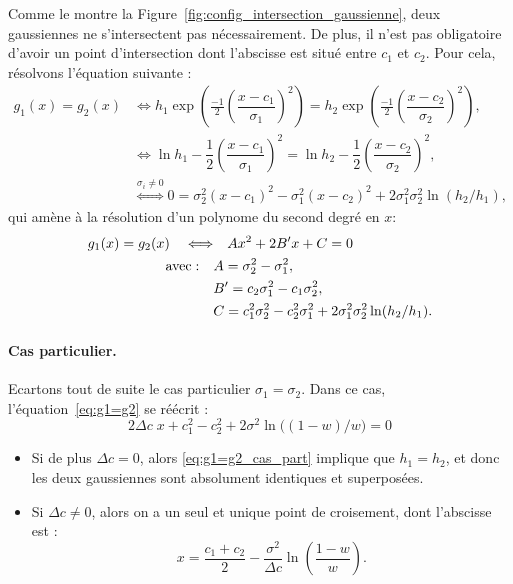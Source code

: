 \documentclass[main.tex]{subfiles}
\begin{document}
Comme le montre la Figure~\ref{fig:config_intersection_gaussienne}, deux gaussiennes ne s'intersectent pas nécessairement. De plus, il n'est pas obligatoire d'avoir un point d'intersection dont l'abscisse est situé entre $c_1$ et $c_2$. Pour cela, résolvons l'équation suivante :
\begin{align*}
g_1(x)=g_2(x) 
& \Leftrightarrow h_1\exp \left(\frac{-1}{2} \left( \dfrac{x-c_1}{\sigma_1}\right)^2  \right) = h_2\exp \left(\frac{-1}{2} \left( \dfrac{x-c_2}{\sigma_2}\right)^2  \right), \\
& \Leftrightarrow \ln h_1 - \dfrac{1}{2}\left( \dfrac{x-c_1}{\sigma_1} \right)^2 = \ln h_2 - \dfrac{1}{2}\left( \dfrac{x-c_2}{\sigma_2} \right)^2, \\
& \overset{\sigma_i \neq 0}{\Leftrightarrow} 0 = \sigma_2^2 (x-c_1)^2 - \sigma_1^2 (x-c_2)^2 + 2\sigma_1^2\sigma_2^2 \ln( h_2 / h_1 ),
\end{align*}
qui amène à la résolution d'un polynome du second degré en $x$:
\begin{equation}
\begin{aligned}
\label{eq:g1=g2}
g_1(x)=g_2(x) \quad \Longleftrightarrow & \quad  Ax^2 + 2B'x + C =0 \\
{\rm avec :} \quad &A=\sigma_2^2 - \sigma_1^2, \\
& B'=c_2\sigma_1^2-c_1\sigma_2^2,\\
& C= c_1^2\sigma_2^2-c_2^2\sigma_1^2 +  2\sigma_1^2\sigma_2^2 \ln( h_2 / h_1 ).
\end{aligned}
\end{equation}
\paragraph{Cas particulier. \label{para:cas_partic_polynome}}
Ecartons tout de suite le cas particulier $\sigma_1=\sigma_2$. %
Dans ce cas, l'équation~\eqref{eq:g1=g2} se réécrit :
\begin{equation}
\label{eq:g1=g2_cas_part}
2\Delta c \; x + c_1^2-c_2^2 +  2 \sigma^2 \ln \big( (1-w) / w \big) = 0
\end{equation}
\begin{itemize}
\item Si de plus $\Delta c=0$, alors \eqref{eq:g1=g2_cas_part} implique que $h_1=h_2$, et donc les deux gaussiennes sont absolument identiques et superposées.
\item Si $\Delta c\neq0$, alors on a un seul et unique point de croisement, dont l'abscisse est :
\begin{equation}
\label{eq:pt_croisement_unique}
x=\dfrac{c_1+c_2}{2}-\dfrac{\sigma^2}{\Delta c}\ln \left( \dfrac{1-w}{w} \right).
\end{equation}
\end{itemize}
\end{document}
